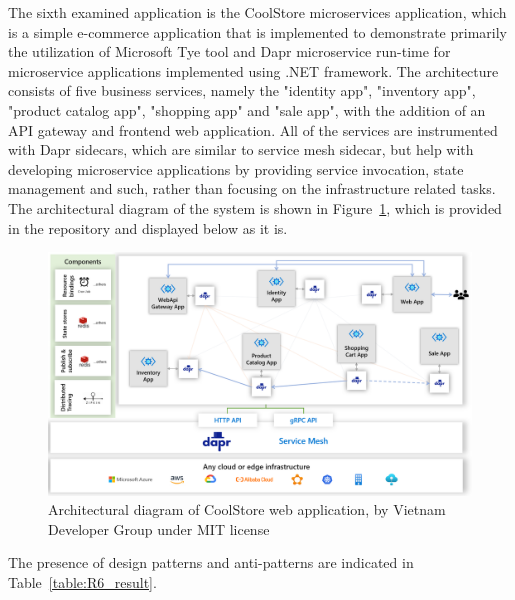 \documentclass{Configuration_Files/PoliMi3i_thesis}
\begin{document}
The sixth examined application is the CoolStore microservices application, which is a simple e-commerce application that is implemented to demonstrate primarily the utilization of Microsoft Tye\footnotemark[95] tool and Dapr\footnotemark[96] microservice run-time for microservice applications implemented using .NET framework.
The architecture consists of five business services, namely the "identity app", "inventory app", "product catalog app", "shopping app" and "sale app", with the addition of an API gateway and frontend web application.
All of the services are instrumented with Dapr sidecars, which are similar to service mesh sidecar, but help with developing microservice applications by providing service invocation, state management and such, rather than focusing on the infrastructure related tasks.
The architectural diagram of the system is shown in Figure~\ref{fig:R6_arch}, which is provided in the repository and displayed below as it is.

\begin{figure}[H]
\centering
\includegraphics[width=1\textwidth]{myImages/R6.png}
\caption{Architectural diagram of CoolStore web application, by Vietnam Developer Group under MIT license}
\label{fig:R6_arch}
\end{figure}

The presence of design patterns and anti-patterns are indicated in Table~\ref{table:R6_result}.
\end{document}
